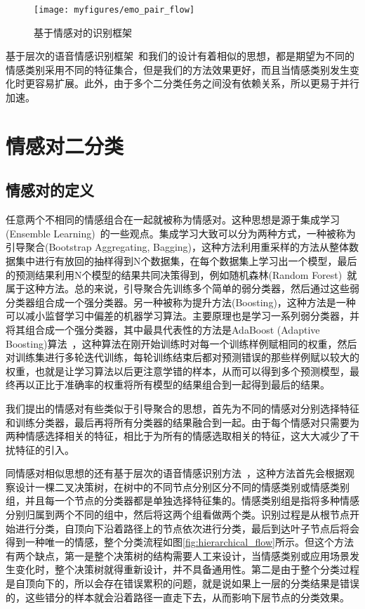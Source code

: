 \begin{figure}[htb] %
    \centering
    \texttt{[image: myfigures/emo\_pair\_flow]}
    \caption{基于情感对的识别框架}
    \label{fig:emo_pair_flow}
\end{figure}

基于层次的语音情感识别框架~\cite{Lee2009Emotion}和我们的设计有着相似的思想，都是期望为不同的情感类别采用不同的特征集合，但是我们的方法效果更好，而且当情感类别发生变化时更容易扩展。此外，由于多个二分类任务之间没有依赖关系，所以更易于并行加速。

\section{情感对二分类}
\label{sec:emo_pair}

\subsection{情感对的定义}
\label{ssec:emo_pair_def}
任意两个不相同的情感组合在一起就被称为情感对。这种思想是源于集成学习(Ensemble Learning)~\cite{Liu1999Ensemble}的一些观点。集成学习大致可以分为两种方式，一种被称为引导聚合(Bootstrap Aggregating, Bagging)，这种方法利用重采样的方法从整体数据集中进行有放回的抽样得到N个数据集，在每个数据集上学习出一个模型，最后的预测结果利用N个模型的结果共同决策得到，例如随机森林(Random Forest)~\cite{Liaw2002Classification}就属于这种方法。总的来说，引导聚合先训练多个简单的弱分类器，然后通过这些弱分类器组合成一个强分类器。另一种被称为提升方法(Boosting)，这种方法是一种可以减小监督学习中偏差的机器学习算法。主要原理也是学习一系列弱分类器，并将其组合成一个强分类器，其中最具代表性的方法是AdaBoost (Adaptive Boosting)算法~\cite{Ratsch2001Soft}，这种算法在刚开始训练时对每一个训练样例赋相同的权重，然后对训练集进行多轮迭代训练，每轮训练结束后都对预测错误的那些样例赋以较大的权重，也就是让学习算法以后更注意学错的样本，从而可以得到多个预测模型，最终再以正比于准确率的权重将所有模型的结果组合到一起得到最后的结果。

我们提出的情感对有些类似于引导聚合的思想，首先为不同的情感对分别选择特征和训练分类器，最后再将所有分类器的结果融合到一起。由于每个情感对只需要为两种情感选择相关的特征，相比于为所有的情感选取相关的特征，这大大减少了干扰特征的引入。

同情感对相似思想的还有基于层次的语音情感识别方法~\cite{Lee2009Emotion}，这种方法首先会根据观察设计一棵二叉决策树，在树中的不同节点分别区分不同的情感类别或情感类别组，并且每一个节点的分类器都是单独选择特征集的。情感类别组是指将多种情感分别归属到两个不同的组中，然后将这两个组看做两个类。识别过程是从根节点开始进行分类，自顶向下沿着路径上的节点依次进行分类，最后到达叶子节点后将会得到一种唯一的情感，整个分类流程如图\ref{fig:hierarchical_flow}所示。但这个方法有两个缺点，第一是整个决策树的结构需要人工来设计，当情感类别或应用场景发生变化时，整个决策树就得重新设计，并不具备通用性。第二是由于整个分类过程是自顶向下的，所以会存在错误累积的问题，就是说如果上一层的分类结果是错误的，这些错分的样本就会沿着路径一直走下去，从而影响下层节点的分类效果。

